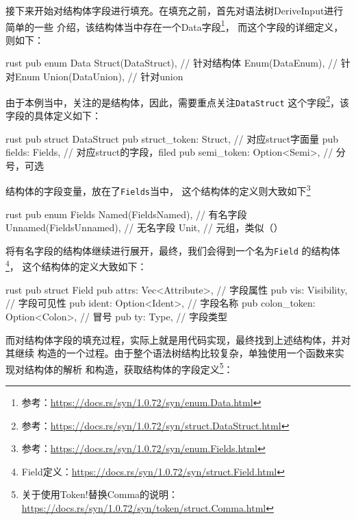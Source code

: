 接下来开始对结构体字段进行填充。在填充之前，首先对语法树DeriveInput进行简单的一些
介绍，该结构体当中存在一个Data字段\footnote{参考：\url{https://docs.rs/syn/1.0.72/syn/enum.Data.html}}，
而这个字段的详细定义，则如下：
\begin{code-block}{rust}
pub enum Data {
    Struct(DataStruct), // 针对结构体
    Enum(DataEnum),     // 针对Enum
    Union(DataUnion),   // 针对union
}
\end{code-block}
由于本例当中，关注的是结构体，因此，需要重点关注\texttt{DataStruct}
这个字段\footnote{参考：\url{https://docs.rs/syn/1.0.72/syn/struct.DataStruct.html}}，该字段的具体定义如下：
\begin{code-block}{rust}
pub struct DataStruct {
    pub struct_token: Struct,       // 对应struct字面量
    pub fields: Fields,             // 对应struct的字段，filed
    pub semi_token: Option<Semi>,   // 分号，可选
}
\end{code-block}
结构体的字段变量，放在了\texttt{Fields}当中，
这个结构体的定义则大致如下\footnote{参考：\url{https://docs.rs/syn/1.0.72/syn/enum.Fields.html}}
\begin{code-block}{rust}
pub enum Fields {
    Named(FieldsNamed),         // 有名字段
    Unnamed(FieldsUnnamed),     // 无名字段
    Unit,                       // 元组，类似（）
}
\end{code-block}
将有名字段的结构体继续进行展开，最终，我们会得到一个名为\texttt{Field}
的结构体\footnote{Field定义：\url{https://docs.rs/syn/1.0.72/syn/struct.Field.html}}，
这个结构体的定义大致如下：
\begin{code-block}{rust}
pub struct Field {
    pub attrs: Vec<Attribute>,          // 字段属性
    pub vis: Visibility,                // 字段可见性
    pub ident: Option<Ident>,           // 字段名称
    pub colon_token: Option<Colon>,     // 冒号
    pub ty: Type,                       // 字段类型
}
\end{code-block}
而对结构体字段的填充过程，实际上就是用代码实现，最终找到上述结构体，并对其继续
构造的一个过程。由于整个语法树结构比较复杂，单独使用一个函数来实现对结构体的解析
和构造，获取结构体的字段定义\footnote{关于使用Token!替换Comma的说明：\url{https://docs.rs/syn/1.0.72/syn/token/struct.Comma.html}}：
